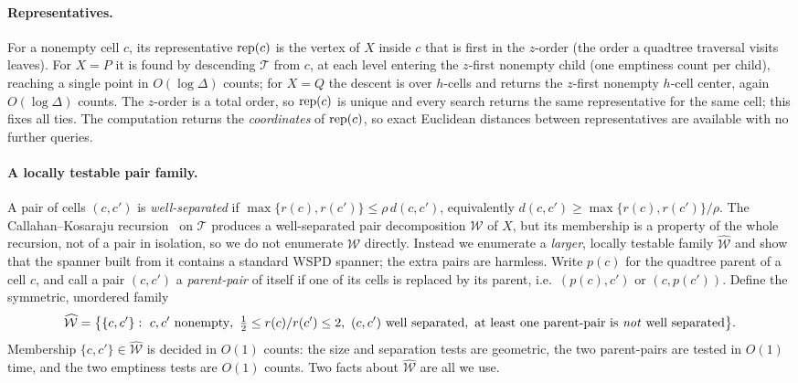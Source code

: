 \paragraph{Representatives.}
For a nonempty cell $c$, its representative $\operatorname{rep}(c)$ is the vertex of $X$ inside $c$ that is first in the
$z$-order (the order a quadtree traversal visits leaves). For $X=P$ it is found by descending $\mathcal T$
from $c$, at each level entering the $z$-first nonempty child (one emptiness count per child), reaching a
single point in $O(\log\Delta)$ counts; for $X=Q$ the descent is over $h$-cells and returns the $z$-first
nonempty $h$-cell center, again $O(\log\Delta)$ counts. The $z$-order is a total order, so $\operatorname{rep}(c)$ is
unique and every search returns the same representative for the same cell; this fixes all ties. The
computation returns the \emph{coordinates} of $\operatorname{rep}(c)$, so exact Euclidean distances between
representatives are available with no further queries.

\paragraph{A locally testable pair family.}
A pair of cells $(c,c')$ is \emph{well-separated} if $\max\{r(c),r(c')\}\le\rho\,d(c,c')$, equivalently
$d(c,c')\ge\max\{r(c),r(c')\}/\rho$. The Callahan--Kosaraju recursion~\cite{CK95} on $\mathcal T$ produces a
well-separated pair decomposition $\mathcal W$ of $X$, but its membership is a property of the whole
recursion, not of a pair in isolation, so we do not enumerate $\mathcal W$ directly. Instead we enumerate a
\emph{larger}, locally testable family $\widehat{\mathcal W}$ and show that the spanner built from it
contains a standard WSPD spanner; the extra pairs are harmless. Write $p(c)$ for the quadtree parent of a
cell $c$, and call a pair $(c,c')$ a \emph{parent-pair} of itself if one of its cells is replaced by its
parent, i.e.\ $(p(c),c')$ or $(c,p(c'))$. Define the symmetric, unordered family
\[
  \widehat{\mathcal W}=\bigl\{\{c,c'\}:\ \text{$c,c'$ nonempty},\ \tfrac12\le r(c)/r(c')\le 2,\
   \text{$(c,c')$ well separated},\ \text{at least one parent-pair is \emph{not} well separated}\bigr\}.
\]
Membership $\{c,c'\}\in\widehat{\mathcal W}$ is decided in $O(1)$ counts: the size and separation tests are
geometric, the two parent-pairs are tested in $O(1)$ time, and the two emptiness tests are $O(1)$ counts.
Two facts about $\widehat{\mathcal W}$ are all we use.

